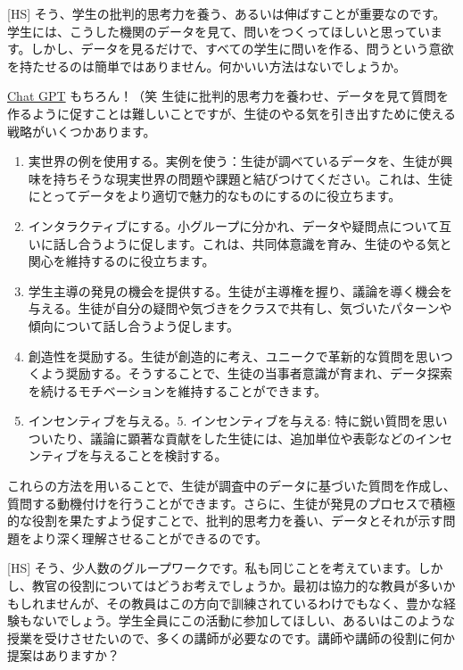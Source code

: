 \documentclass[
]{book}
\theoremstyle{definition}
\theoremstyle{definition}
\theoremstyle{definition}
\theoremstyle{definition}
\theoremstyle{remark}
\begin{document}
{[}HS{]} そう、学生の批判的思考力を養う、あるいは伸ばすことが重要なのです。学生には、こうした機関のデータを見て、問いをつくってほしいと思っています。しかし、データを見るだけで、すべての学生に問いを作る、問うという意欲を持たせるのは簡単ではありません。何かいい方法はないでしょうか。

\protect\hyperlink{chatgpt}{Chat GPT} もちろん！（笑 生徒に批判的思考力を養わせ、データを見て質問を作るように促すことは難しいことですが、生徒のやる気を引き出すために使える戦略がいくつかあります。

\begin{enumerate}
\def\labelenumi{\arabic{enumi}.}
\item
  実世界の例を使用する。実例を使う：生徒が調べているデータを、生徒が興味を持ちそうな現実世界の問題や課題と結びつけてください。これは、生徒にとってデータをより適切で魅力的なものにするのに役立ちます。
\item
  インタラクティブにする。小グループに分かれ、データや疑問点について互いに話し合うように促します。これは、共同体意識を育み、生徒のやる気と関心を維持するのに役立ちます。
\item
  学生主導の発見の機会を提供する。生徒が主導権を握り、議論を導く機会を与える。生徒が自分の疑問や気づきをクラスで共有し、気づいたパターンや傾向について話し合うよう促します。
\item
  創造性を奨励する。生徒が創造的に考え、ユニークで革新的な質問を思いつくよう奨励する。そうすることで、生徒の当事者意識が育まれ、データ探索を続けるモチベーションを維持することができます。
\item
  インセンティブを与える。5. インセンティブを与える: 特に鋭い質問を思いついたり、議論に顕著な貢献をした生徒には、追加単位や表彰などのインセンティブを与えることを検討する。
\end{enumerate}

これらの方法を用いることで、生徒が調査中のデータに基づいた質問を作成し、質問する動機付けを行うことができます。さらに、生徒が発見のプロセスで積極的な役割を果たすよう促すことで、批判的思考力を養い、データとそれが示す問題をより深く理解させることができるのです。

{[}HS{]} そう、少人数のグループワークです。私も同じことを考えています。しかし、教官の役割についてはどうお考えでしょうか。最初は協力的な教員が多いかもしれませんが、その教員はこの方向で訓練されているわけでもなく、豊かな経験もないでしょう。学生全員にこの活動に参加してほしい、あるいはこのような授業を受けさせたいので、多くの講師が必要なのです。講師や講師の役割に何か提案はありますか？
\end{document}
